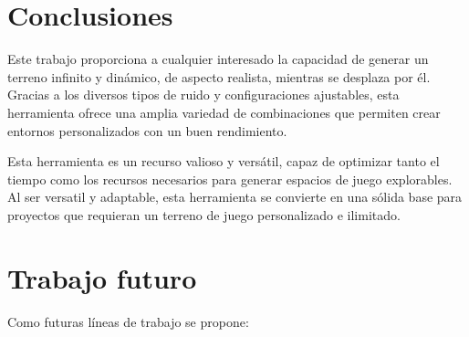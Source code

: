
\section{Conclusiones}

Este trabajo proporciona a cualquier interesado la capacidad de generar un terreno infinito y dinámico, de aspecto realista, mientras se desplaza por él. Gracias a los diversos tipos de ruido y configuraciones ajustables, esta herramienta ofrece una amplia variedad de combinaciones que permiten crear entornos personalizados con un buen rendimiento.

Esta herramienta es un recurso valioso y versátil, capaz de optimizar tanto el tiempo como los recursos necesarios para generar espacios de juego explorables. Al ser versatil y adaptable, esta herramienta se convierte en una sólida base para proyectos que requieran un terreno de juego personalizado e ilimitado.

\section{Trabajo futuro}
Como futuras líneas de trabajo se propone:

